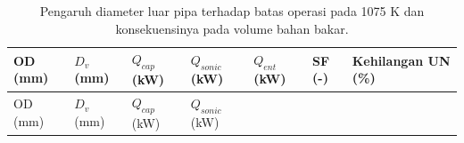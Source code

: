 \documentclass[
  indonesian,
  12pt,
  a4paper,
]{report}
\begin{document}
\begin{longtable}[]{@{}
  >{\centering\arraybackslash}p{}
  >{\centering\arraybackslash}p{}
  >{\centering\arraybackslash}p{}
  >{\centering\arraybackslash}p{}
  >{\centering\arraybackslash}p{}
  >{\centering\arraybackslash}p{}
  >{\centering\arraybackslash}p{}@{}}
\caption{Pengaruh diameter luar pipa terhadap batas operasi pada 1075 K
dan konsekuensinya pada volume bahan
bakar.}\label{tbl-trade}\tabularnewline
\toprule\noalign{}
\begin{minipage}[b]{\linewidth}\centering
OD (mm)
\end{minipage} & \begin{minipage}[b]{\linewidth}\centering
\(D_v\) (mm)
\end{minipage} & \begin{minipage}[b]{\linewidth}\centering
\(Q_{cap}\) (kW)
\end{minipage} & \begin{minipage}[b]{\linewidth}\centering
\(Q_{sonic}\) (kW)
\end{minipage} & \begin{minipage}[b]{\linewidth}\centering
\(Q_{ent}\) (kW)
\end{minipage} & \begin{minipage}[b]{\linewidth}\centering
SF (-)
\end{minipage} & \begin{minipage}[b]{\linewidth}\centering
Kehilangan UN (\%)
\end{minipage} \\
\midrule\noalign{}
\endfirsthead
\toprule\noalign{}
\begin{minipage}[b]{\linewidth}\centering
OD (mm)
\end{minipage} & \begin{minipage}[b]{\linewidth}\centering
\(D_v\) (mm)
\end{minipage} & \begin{minipage}[b]{\linewidth}\centering
\(Q_{cap}\) (kW)
\end{minipage} & \begin{minipage}[b]{\linewidth}\centering
\(Q_{sonic}\) (kW)
\end{minipage} & \begin{minipage}[b]{\linewidth}\centering

\end{minipage}
\end{longtable}
\end{document}
